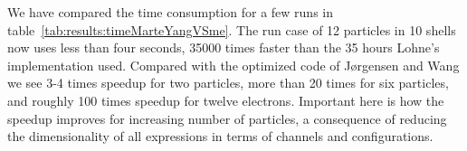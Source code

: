 We have compared the time consumption for a few runs in table~\ref{tab:results:timeMarteYangVSme}.
The run case of 12 particles in 10 shells now uses less than four seconds, 35000 times faster than the 35 hours Lohne's implementation used.
Compared with the optimized code of Jørgensen and Wang we see 3-4 times speedup for two particles, more than 20 times for six particles, and roughly 100 times speedup for twelve electrons.
Important here is how the speedup improves for increasing number of particles, a consequence of reducing the dimensionality of all expressions in terms of channels and configurations.
\begin{table}
\begin{center}
\caption{Time}
\label{tab:results:timeMarteYangVSme}
\hspace{5mm}
\end{center}
\end{table}


